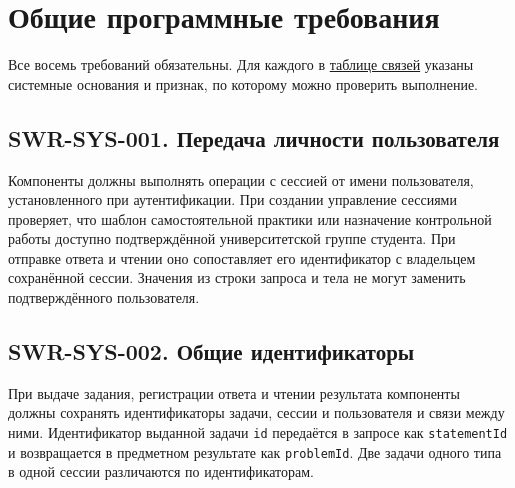\documentclass[12pt,a4paper]{article}
\begin{document}
\section{Общие программные требования}\label{3-ux43eux431ux449ux438ux435-ux43fux440ux43eux433ux440ux430ux43cux43cux43dux44bux435-ux442ux440ux435ux431ux43eux432ux430ux43dux438ux44f}

\hypertarget{3-общие-программные-требования}{}

Все восемь требований обязательны. Для каждого в {\hyperlink{5-связи-и-проверка-редакции}{таблице связей}} указаны системные основания и признак, по которому можно проверить выполнение.

\subsection{SWR-SYS-001. Передача личности пользователя}\label{swr-sys-001-ux43fux435ux440ux435ux434ux430ux447ux430-ux43bux438ux447ux43dux43eux441ux442ux438-ux43fux43eux43bux44cux437ux43eux432ux430ux442ux435ux43bux44f}

\hypertarget{swr-sys-001-передача-личности-пользователя}{}

\hypertarget{swr-sys-001}{}

Компоненты должны выполнять операции с сессией от имени пользователя, установленного при аутентификации. При создании управление сессиями проверяет, что шаблон самостоятельной практики или назначение контрольной работы доступно подтверждённой университетской группе студента. При отправке ответа и чтении оно сопоставляет его идентификатор с владельцем сохранённой сессии. Значения из строки запроса и тела не могут заменить подтверждённого пользователя.

\subsection{SWR-SYS-002. Общие идентификаторы}\label{swr-sys-002-ux43eux431ux449ux438ux435-ux438ux434ux435ux43dux442ux438ux444ux438ux43aux430ux442ux43eux440ux44b}

\hypertarget{swr-sys-002-общие-идентификаторы}{}

\hypertarget{swr-sys-002}{}

При выдаче задания, регистрации ответа и чтении результата компоненты должны сохранять идентификаторы задачи, сессии и пользователя и связи между ними. Идентификатор выданной задачи \texttt{id} передаётся в запросе как \texttt{statement\allowbreak{}Id} и возвращается в предметном результате как \texttt{problemId}. Две задачи одного типа в одной сессии различаются по идентификаторам.
\end{document}
